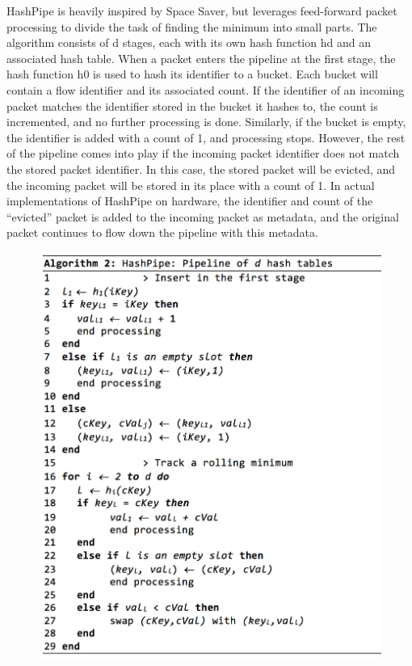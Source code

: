 HashPipe is heavily inspired by Space Saver, but leverages feed-forward packet processing to divide the task of finding the minimum into small parts. The algorithm consists of d stages, each with its own hash function hd and an associated hash table. When a packet enters the pipeline at the first stage, the hash function h0 is used to hash its identifier to a bucket. Each bucket will contain a flow identifier and its associated count. If the identifier of an incoming packet matches the identifier stored in the bucket it hashes to, the count is incremented, and no further processing is done. Similarly, if the bucket is empty, the identifier is added with a count of 1, and processing stops. However, the rest of the pipeline comes into play if the incoming packet identifier does not match the stored packet identifier. In this case, the stored packet will be evicted, and the incoming packet will be stored in its place with a count of 1. In actual implementations of HashPipe on hardware, the identifier and count of the “evicted” packet is added to the incoming packet as metadata, and the original packet continues to flow down the pipeline with this metadata.

\begin{figure}[t]
  \centering
    \includegraphics[scale=0.42]{alg2}
     \label{fig:bp-image}
\end{figure}

